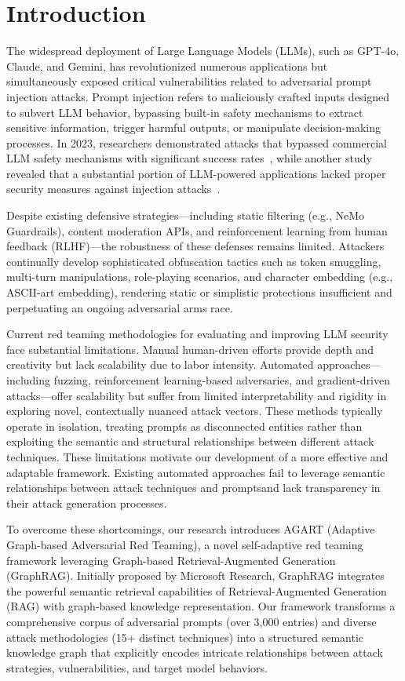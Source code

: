 \section{Introduction}

The widespread deployment of Large Language Models (LLMs), such as GPT-4o, Claude, and Gemini, has revolutionized numerous applications but simultaneously exposed critical vulnerabilities related to adversarial prompt injection attacks. Prompt injection refers to maliciously crafted inputs designed to subvert LLM behavior, bypassing built-in safety mechanisms to extract sensitive information, trigger harmful outputs, or manipulate decision-making processes. In 2023, researchers demonstrated attacks that bypassed commercial LLM safety mechanisms with significant success rates~\cite{liu2023autodan}, while another study revealed that a substantial portion of LLM-powered applications lacked proper security measures against injection attacks~\cite{greshake2023youve}.

Despite existing defensive strategies—including static filtering (e.g., NeMo Guardrails\cite{nvidia2023nemo}), content moderation APIs, and reinforcement learning from human feedback (RLHF)—the robustness of these defenses remains limited. Attackers continually develop sophisticated obfuscation tactics such as token smuggling, multi-turn manipulations, role-playing scenarios, and character embedding (e.g., ASCII-art embedding), rendering static or simplistic protections insufficient and perpetuating an ongoing adversarial arms race.

Current red teaming methodologies for evaluating and improving LLM security face substantial limitations. Manual human-driven efforts provide depth and creativity but lack scalability due to labor intensity. Automated approaches—including fuzzing\cite{yu2024llmfuzzer}, reinforcement learning-based adversaries, and gradient-driven attacks—offer scalability but suffer from limited interpretability and rigidity in exploring novel, contextually nuanced attack vectors. These methods typically operate in isolation, treating prompts as disconnected entities rather than exploiting the semantic and structural relationships between different attack techniques. These limitations motivate our development of a more effective and adaptable framework. Existing automated approaches fail to leverage semantic relationships between attack techniques and promptsand lack transparency in their attack generation processes.

To overcome these shortcomings, our research introduces AGART (Adaptive Graph-based Adversarial Red Teaming), a novel self-adaptive red teaming framework leveraging Graph-based Retrieval-Augmented Generation (GraphRAG). Initially proposed by Microsoft Research, GraphRAG integrates the powerful semantic retrieval capabilities of Retrieval-Augmented Generation (RAG) with graph-based knowledge representation. Our framework transforms a comprehensive corpus of adversarial prompts (over 3,000 entries) and diverse attack methodologies (15+ distinct techniques) into a structured semantic knowledge graph that explicitly encodes intricate relationships between attack strategies, vulnerabilities, and target model behaviors.

